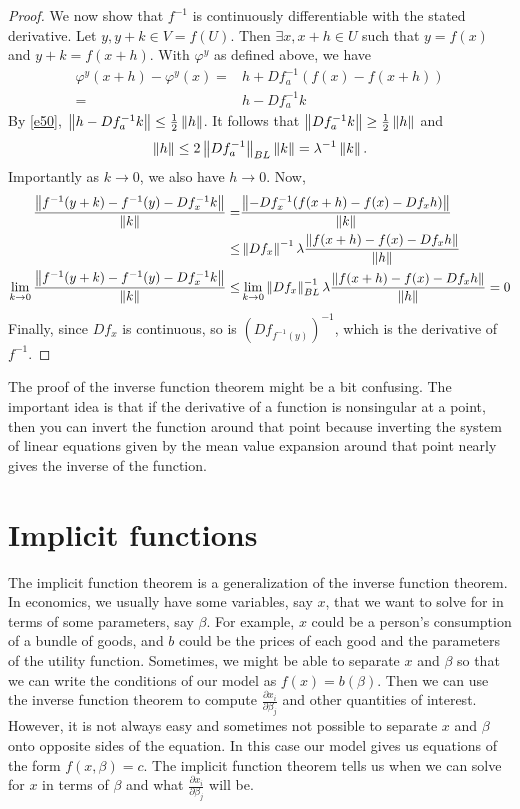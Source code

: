\begin{proof}
  We now show that $f^{-1}$ is continuously differentiable with the
  stated derivative. Let $y, y+k \in V = f(U)$. Then $\exists x, x+h
  \in U$ such that $y = f(x)$ and $y+k = f(x+h)$. With $\varphi^y$ as
  defined above, we have
  \begin{align*}
    \varphi^y(x+h) - \varphi^y(x) = & h + Df_a^{-1}(f(x) - f(x+h))  \\
    = & h - Df_a^{-1} k
  \end{align*}
  By \ref{e50}, $\left\Vert {h - Df_a^{-1} k} \right\Vert \leq \frac{1}{2} \left\Vert {h} \right\Vert$. It
  follows that $\left\Vert {Df_a^{-1} k} \right\Vert \geq \frac{1}{2} \left\Vert {h} \right\Vert$ and 
  \[ \left\Vert {h} \right\Vert \leq 2 \left\Vert {Df_a^{-1}} \right\Vert_{BL} \left\Vert {k} \right\Vert = \lambda^{-1}
  \left\Vert {k} \right\Vert. \]
  Importantly as $k \to 0$, we also have $h \to 0$. Now, 
  \begin{align*}
    \frac{\left\Vert {f^{-1} (y+k) - f^{-1}(y) - Df_x^{-1} k } \right\Vert}{\left\Vert {k} \right\Vert}
    = & \frac{\left\Vert {-Df_x^{-1}(f(x+h) - f(x) - Df_x h)} \right\Vert}{\left\Vert {k} \right\Vert}
    \\
    \leq & \left\Vert {Df_x} \right\Vert^{-1}\lambda \frac{\left\Vert {f(x+h) - f(x) - Df_x
        h} \right\Vert}{\left\Vert {h} \right\Vert} \\
    \lim_{k {\rightarrow} 0} \frac{\left\Vert {f^{-1} (y+k) - f^{-1}(y) - Df_x^{-1} k
      } \right\Vert}{\left\Vert {k} \right\Vert} \leq & \lim_{k {\rightarrow} 0} \left\Vert {Df_x} \right\Vert_{BL}^{-1}\lambda
    \frac{\left\Vert {f(x+h) - f(x) - Df_x h} \right\Vert}{\left\Vert {h} \right\Vert} = 0
  \end{align*}
  Finally, since $Df_x$ is continuous, so is $(Df_{f^{-1}(y)})^{-1}$,
  which is the derivative of $f^{-1}$.  
\end{proof}
The proof of the inverse function theorem might be a bit
confusing. The important idea is that if the derivative of a function
is nonsingular at a point, then you can invert the function around
that point because inverting the system of linear equations given by
the mean value expansion around that point nearly gives the inverse of
the function. 

\section{Implicit functions}

The implicit function theorem is a generalization of the inverse
function theorem. In economics, we usually have some variables, say
$x$, that we want to solve for in terms of some parameters, say
$\beta$. For example, $x$ could be a person's consumption of a bundle of
goods, and $b$ could be the prices of each good and the parameters of
the utility function. Sometimes, we might be able to separate $x$ and
$\beta$ so that we can write the conditions of our model as $f(x) =
b(\beta)$. Then we can use the inverse function theorem to compute
$\frac{\partial x_i}{  \partial \beta_j}$ and other quantities of
interest. However, it is not always easy and sometimes not possible to
separate $x$ and $\beta$ onto opposite sides of the equation. In this
case our model gives us equations of the form $f(x,\beta) = c$. The
implicit function theorem tells us when we can solve for $x$ in terms
of $\beta$ and what $\frac{\partial x_i}{\partial \beta_j}$ will be.

